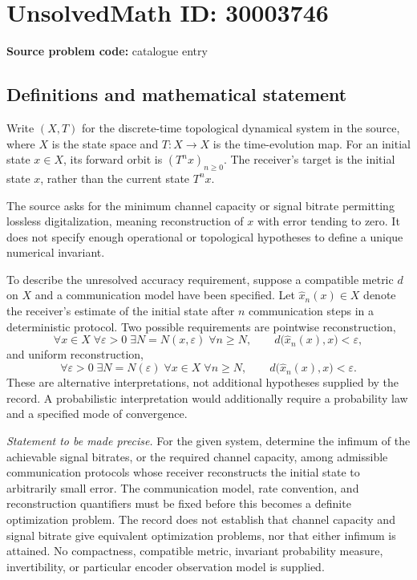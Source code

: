 \documentclass[11pt]{article}
\begin{document}
\section*{UnsolvedMath ID: 30003746}
\textbf{Source problem code:} catalogue entry
\subsection{Definitions and mathematical statement}
Write \((X,T)\) for the discrete-time topological dynamical system in the source, where \(X\) is the state space and \(T:X\to X\) is the time-evolution map. For an initial state \(x\in X\), its forward orbit is \((T^n x)_{n\geq 0}\). The receiver's target is the initial state \(x\), rather than the current state \(T^n x\).

The source asks for the minimum channel capacity or signal bitrate permitting lossless digitalization, meaning reconstruction of \(x\) with error tending to zero. It does not specify enough operational or topological hypotheses to define a unique numerical invariant.

To describe the unresolved accuracy requirement, suppose a compatible metric \(d\) on \(X\) and a communication model have been specified. Let \(\widehat{x}_n(x)\in X\) denote the receiver's estimate of the initial state after \(n\) communication steps in a deterministic protocol. Two possible requirements are pointwise reconstruction,
\[
\forall x\in X\;\forall\varepsilon>0\;\exists N=N(x,\varepsilon)\;\forall n\geq N,
\qquad d\bigl(\widehat{x}_n(x),x\bigr)<\varepsilon,
\]
and uniform reconstruction,
\[
\forall\varepsilon>0\;\exists N=N(\varepsilon)\;\forall x\in X\;\forall n\geq N,
\qquad d\bigl(\widehat{x}_n(x),x\bigr)<\varepsilon.
\]
These are alternative interpretations, not additional hypotheses supplied by the record. A probabilistic interpretation would additionally require a probability law and a specified mode of convergence.

\emph{Statement to be made precise.} For the given system, determine the infimum of the achievable signal bitrates, or the required channel capacity, among admissible communication protocols whose receiver reconstructs the initial state to arbitrarily small error. The communication model, rate convention, and reconstruction quantifiers must be fixed before this becomes a definite optimization problem. The record does not establish that channel capacity and signal bitrate give equivalent optimization problems, nor that either infimum is attained. No compactness, compatible metric, invariant probability measure, invertibility, or particular encoder observation model is supplied.
\end{document}
